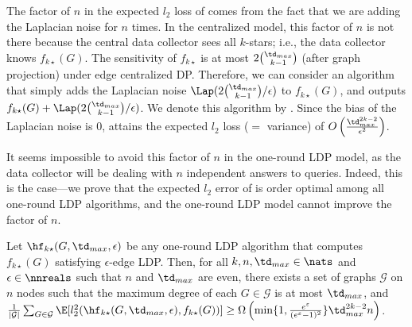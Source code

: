 The factor of $n$ in the 
expected $l_2$ loss 
of 
comes from the fact that we are adding 
the Laplacian noise for $n$ times. 
In the centralized model, this factor of $n$ is not there
because the central data collector sees all $k$-stars; i.e., the data collector knows $f_{k\star}(G)$. 
The 
sensitivity of $f_{k\star}$ is 
at most $2\binom{\td_{max}}{k-1}$ (after graph projection) under edge centralized DP. 
Therefore, we can consider an algorithm that simply adds the Laplacian noise $\Lap(2\binom{\td_{max}}{k-1}/\epsilon)$ to $f_{k\star}(G)$, and outputs $f_{k\star}(G) + \Lap(2\binom{\td_{max}}{k-1}/\epsilon)$. 
We denote this algorithm by . 
Since the bias of the Laplacian noise is $0$, 
 attains the expected $l_2$ loss ($=$ variance) of $O\left(\frac{\td_{max}^{2k-2}}{\epsilon^2}\right)$. 

It seems impossible to avoid this factor of $n$ in the 
one-round 
LDP model, as the data collector will be dealing with $n$ independent answers to
queries. Indeed, this is the case---we prove that the expected $l_2$ error of  
is order optimal among all 
one-round 
LDP algorithms, and 
the 
one-round 
LDP model cannot
improve 
the factor of $n$.

\begin{corollary}\label{cor:kstars-lb}
  Let 
  $\hf_{k\star}(G,\td_{max},\epsilon)$
  be any 
  one-round 
  LDP algorithm that 
  computes $f_{k\star}(G)$ satisfying $\epsilon$-edge LDP. Then, for all
  $k,n,\td_{max} \in \nats$ and $\epsilon \in \nnreals$ such that 
  $n$ and $\td_{max}$ are even, 
  there exists a set of graphs $\mathcal{G}$
  on $n$ 
  nodes 
  such that 
  the maximum degree of each $G \in \mathcal{G}$ is
  at most $\td_{max}$,
  and 
  $\frac{1}{|\mathcal{G}|}\sum_{G \in \mathcal{G}}\E[l_2^2(\hf_{k\star}(G,\td_{max},\epsilon), f_{k\star}(G))] 
  \geq 
  \Omega\left(\min \{1, \frac{e^\varepsilon}{(e^\varepsilon-1)^2}\}\td_{max}^{2k-2}n \right)$.
\end{corollary}

